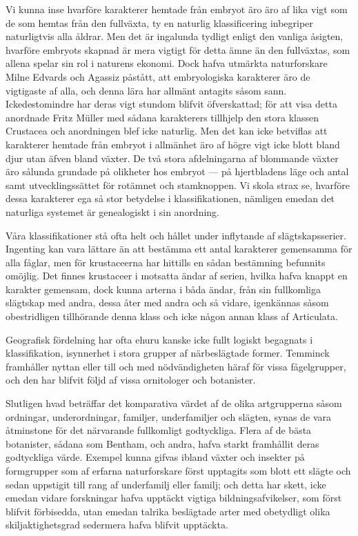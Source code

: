 Vi kunna inse hvarföre karakterer hemtade från embryot äro äro af lika vigt som de som hemtas från den fullväxta, ty en naturlig klassificering inbegriper naturligtvis alla åldrar. Men det är ingalunda tydligt enligt den vanliga åsigten, hvarföre embryots skapnad är mera vigtigt för detta ämne än den fullväxtas, som allena spelar sin rol i naturens ekonomi. Dock hafva utmärkta naturforskare Milne Edvards och Agassiz påstått, att embryologiska karakterer äro de vigtigaste af alla, och denna lära har allmänt antagits såsom sann. Ickedestomindre har deras vigt stundom blifvit öfverskattad; för att visa detta anordnade Fritz Müller med sådana karakterers tillhjelp den stora klassen Crustacea och anordningen blef icke naturlig. Men det kan icke betviflas att karakterer hemtade från embryot i allmänhet äro af högre vigt icke blott bland djur utan äfven bland växter. De två stora afdelningarna af blommande växter äro sålunda grundade på olikheter hos embryot — på hjertbladens läge och antal samt utvecklingssättet för rotämnet och stamknoppen. Vi skola strax se, hvarföre dessa karakterer ega så stor betydelse i klassifikationen, nämligen emedan det naturliga systemet är genealogiskt i sin anordning.

Våra klassifikationer stå ofta helt och hållet under inflytande af slägtskapsserier. Ingenting kan vara lättare än att bestämma ett antal karakterer gemensamma för alla fåglar, men för krustaceerna har hittills en sådan bestämning befunnits omöjlig. Det finnes krustaceer i motsatta ändar af serien, hvilka hafva knappt en karakter gemensam, dock kunna arterna i båda ändar, från sin fullkomliga slägtskap med andra, dessa åter med andra och så vidare, igenkännas såsom obestridligen tillhörande denna klass och icke någon annan klass af Articulata.

Geografisk fördelning har ofta ehuru kanske icke fullt logiskt begagnats i klassifikation, isynnerhet i stora grupper af närbeslägtade former. Temminck framhåller nyttan eller till och med nödvändigheten häraf för vissa fågelgrupper, och den har blifvit följd af vissa ornitologer och botanister.

Slutligen hvad beträffar det komparativa värdet af de olika artgrupperna såsom ordningar, underordningar, familjer, underfamiljer och slägten, synas de vara åtminstone för det närvarande fullkomligt godtyckliga. Flera af de bästa botanister, sådana som Bentham, och andra, hafva starkt framhållit deras godtyckliga värde. Exempel kunna gifvas ibland växter och insekter på formgrupper som af erfarna naturforskare först upptagits som blott ett slägte och sedan uppstigit till rang af underfamilj eller familj; och detta har skett, icke emedan vidare forskningar hafva upptäckt vigtiga bildningsafvikelser, som först blifvit förbisedda, utan emedan talrika beslägtade arter med obetydligt olika skiljaktighetsgrad sedermera hafva blifvit upptäckta.

